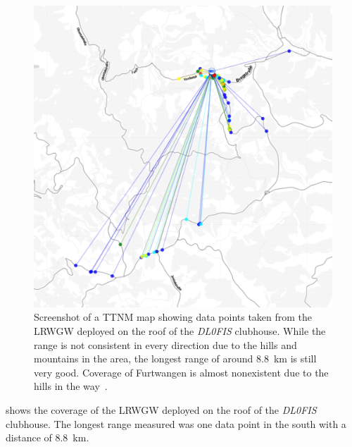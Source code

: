\begin{figure}[htbp]
    \centering
    \includegraphics[width=.8\textwidth]{pictures/ttn-mapper/gateway-ranges/dl0fis_gw_range.jpg}
    \caption{
        Screenshot of a \ac{TTNM} map showing data points taken from the \acl{LRWGW} deployed on the roof of the \emph{DL0FIS} clubhouse.
        While the range is not consistent in every direction due to the hills and mountains in the area, the longest range of around \SI{8.8}{\kilo\meter} is still very good.
        Coverage of Furtwangen is almost nonexistent due to the hills in the way~\cite{ttn_mapper_ttn_2023}.
    }\label{pic:dl0fis_gw_range}
\end{figure}

 shows the coverage of the \acl{LRWGW} deployed on the roof of the \emph{DL0FIS} clubhouse.
The longest range measured was one data point in the south with a distance of \SI{8.8}{\kilo\meter}.

